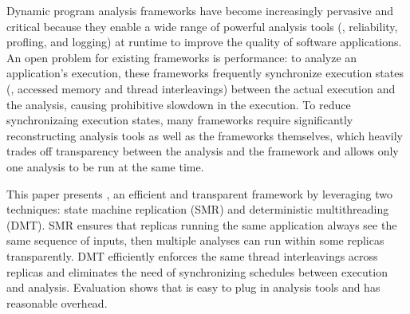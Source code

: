 % 

Dynamic program analysis frameworks have become increasingly pervasive and 
critical because they enable a wide range of powerful analysis tools (\eg, 
reliability, profling, and logging) at runtime to improve the quality of 
software applications. An open problem for existing frameworks is 
performance: to analyze an application's execution, these frameworks frequently 
synchronize execution states (\eg, accessed memory and thread interleavings) 
between the actual execution and the analysis, causing prohibitive slowdown in 
the execution. To reduce synchronizaing execution states, many frameworks 
require significantly reconstructing analysis tools as well as the frameworks 
themselves, which heavily trades off transparency between the analysis and the 
framework and allows only one analysis to be run at the same time.


This paper presents \xxx, an efficient and transparent framework by leveraging 
two techniques: state machine replication (SMR) and deterministic 
multithreading (DMT). SMR ensures that replicas running the same application 
always see the same sequence of inputs, then multiple analyses can run within 
some replicas transparently. DMT efficiently enforces the same thread 
interleavings across replicas and eliminates the need of synchronizing 
schedules between execution and analysis. Evaluation shows that \xxx is easy to 
plug in analysis tools and has reasonable overhead.